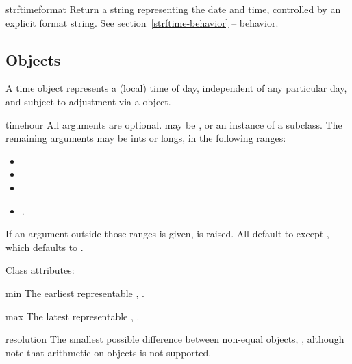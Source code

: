 \begin{methoddesc}{strftime}{format}
  Return a string representing the date and time, controlled by an
  explicit format string.  See section~\ref{strftime-behavior} --
   behavior.
\end{methoddesc}


\subsection{ Objects \label{datetime-time}}

A time object represents a (local) time of day, independent of any
particular day, and subject to adjustment via a  object.

\begin{classdesc}{time}{hour}
  All arguments are optional.   may be , or
  an instance of a  subclass.  The remaining arguments
  may be ints or longs, in the following ranges:

  \begin{itemize}
    \item {}
    \item {}
    \item {}
    \item {}.
  \end{itemize}

  If an argument outside those ranges is given,
   is raised.  All default to  except
  , which defaults to .
\end{classdesc}

Class attributes:

\begin{memberdesc}{min}
  The earliest representable , .
\end{memberdesc}

\begin{memberdesc}{max}
  The latest representable , .
\end{memberdesc}

\begin{memberdesc}{resolution}
  The smallest possible difference between non-equal 
  objects, , although note that
  arithmetic on  objects is not supported.
\end{memberdesc}

